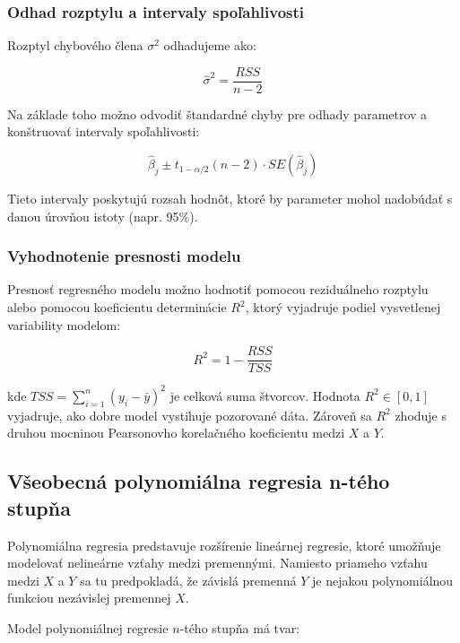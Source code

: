 \subsubsection{Odhad rozptylu a intervaly spoľahlivosti}

Rozptyl chybového člena $\sigma^2$ odhadujeme ako:

\begin{equation}
\hat{\sigma}^2 = \frac{RSS}{n - 2}
\end{equation}

Na základe toho možno odvodiť štandardné chyby pre odhady parametrov a konštruovať intervaly spoľahlivosti:

\begin{equation}
\hat{\beta}_j \pm t_{1 - \alpha/2}(n - 2) \cdot SE(\hat{\beta}_j)
\end{equation}

Tieto intervaly poskytujú rozsah hodnôt, ktoré by parameter mohol nadobúdať s danou úrovňou istoty (napr. 95\%).

\subsubsection{Vyhodnotenie presnosti modelu}

Presnosť regresného modelu možno hodnotiť pomocou reziduálneho rozptylu alebo pomocou koeficientu determinácie $R^2$, ktorý vyjadruje podiel vysvetlenej variability modelom:

\begin{equation}
R^2 = 1 - \frac{RSS}{TSS}
\end{equation}

kde $TSS = \sum_{i=1}^{n}(y_i - \bar{y})^2$ je celková suma štvorcov. Hodnota $R^2 \in [0, 1]$ vyjadruje, ako dobre model vystihuje pozorované dáta. Zároveň sa $R^2$ zhoduje s druhou mocninou Pearsonovho korelačného koeficientu medzi $X$ a $Y$.

\subsection{Všeobecná polynomiálna regresia n-tého stupňa}
\label{subsec:polynomial_regression}

Polynomiálna regresia predstavuje rozšírenie lineárnej regresie, ktoré umožňuje modelovať nelineárne vzťahy medzi premennými. Namiesto priameho vzťahu medzi $X$ a $Y$ sa tu predpokladá, že závislá premenná $Y$ je nejakou polynomiálnou funkciou nezávislej premennej $X$.

Model polynomiálnej regresie $n$-tého stupňa má tvar:

